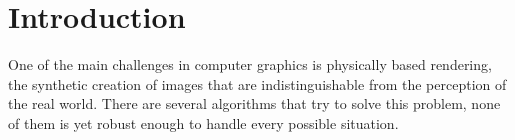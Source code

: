 \chapter{Introduction}

One of the main challenges in computer graphics is physically based rendering, the synthetic creation of images that are indistinguishable from the perception of the real world. There are several algorithms that try to solve this problem, none of them is yet robust enough to handle every possible situation.